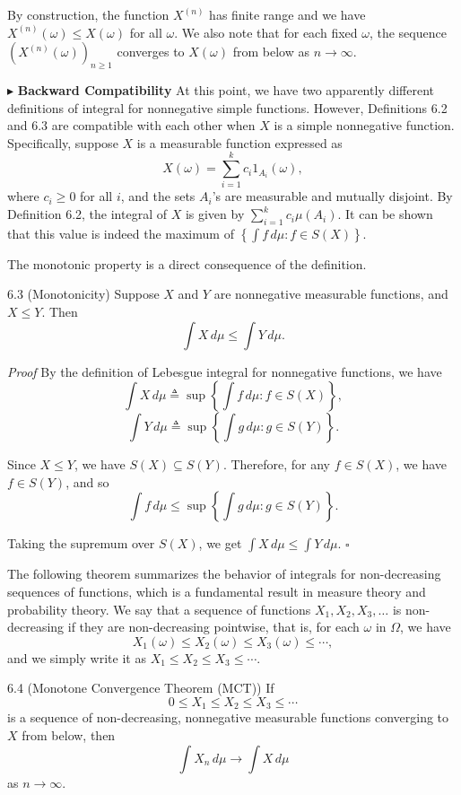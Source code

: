 By construction, the function $X^{(n)}$ has finite range and we have $X^{(n)}(\omega) \le X(\omega)$ for all $\omega$. We also note that for each fixed $\omega$, the sequence $(X^{(n)}(\omega))_{n \ge 1}$ converges to $X(\omega)$ from below as $n \to \infty$.

\noindent$\blacktriangleright$ \textbf{Backward Compatibility} At this point, we have two apparently different definitions of integral for nonnegative simple functions. However, Definitions 6.2 and 6.3 are compatible with each other when $X$ is a simple nonnegative function. Specifically, suppose $X$ is a measurable function expressed as
\[
X(\omega)=\sum_{i=1}^{k} c_i 1_{A_i}(\omega),
\]
where $c_i \ge 0$ for all $i$, and the sets $A_i$'s are measurable and mutually disjoint. By Definition 6.2, the integral of $X$ is given by $\sum_{i=1}^{k} c_i \mu(A_i)$. It can be shown that this value is indeed the maximum of $\left\{\int f\, d\mu : f \in S(X)\right\}$.

The monotonic property is a direct consequence of the definition.

\begin{thmbox}{6.3 (Monotonicity)}
Suppose $X$ and $Y$ are nonnegative measurable functions, and $X \le Y$. Then
\[
\int X\, d\mu \le \int Y\, d\mu.
\]
\end{thmbox}

\textit{Proof} By the definition of Lebesgue integral for nonnegative functions, we have
\[
\int X\, d\mu \triangleq \sup \left\{ \int f\, d\mu : f \in S(X) \right\},
\]
\[
\int Y\, d\mu \triangleq \sup \left\{ \int g\, d\mu : g \in S(Y) \right\}.
\]

Since $X \le Y$, we have $S(X) \subseteq S(Y)$. Therefore, for any $f \in S(X)$, we have $f \in S(Y)$, and so
\[
\int f\, d\mu \le \sup \left\{ \int g\, d\mu : g \in S(Y) \right\}.
\]

Taking the supremum over $S(X)$, we get $\int X\, d\mu \le \int Y\, d\mu$. \hfill $\square$

The following theorem summarizes the behavior of integrals for non-decreasing sequences of functions, which is a fundamental result in measure theory and probability theory. We say that a sequence of functions $X_1,X_2,X_3,\dots$ is non-decreasing if they are non-decreasing pointwise, that is, for each $\omega$ in $\Omega$, we have
\[
X_1(\omega) \le X_2(\omega) \le X_3(\omega) \le \cdots,
\]
and we simply write it as $X_1 \le X_2 \le X_3 \le \cdots$.

\begin{thmbox}{6.4 (Monotone Convergence Theorem (MCT))}
If
\[
0 \le X_1 \le X_2 \le X_3 \le \cdots
\]
is a sequence of non-decreasing, nonnegative measurable functions converging to $X$ from below, then
\[
\int X_n\, d\mu \to \int X\, d\mu
\]
as $n \to \infty$.
\end{thmbox}

